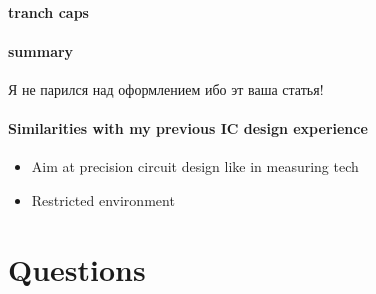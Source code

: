 \documentclass[a4paper,12pt]{article} %
\begin{document}
\paragraph{tranch caps}

\paragraph{summary} Я не парился над оформлением ибо эт ваша статья!


\paragraph{Similarities with my previous IC design experience}
\begin{itemize}
    \item Aim at precision circuit design like in measuring tech
    \item Restricted environment
\end{itemize}

\section{Questions}
\end{document}
